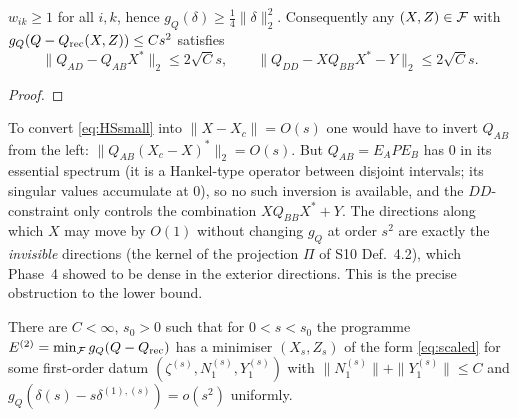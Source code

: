 \documentclass[11pt]{article}
\begin{document}
\begin{proposition}[Coercivity of $g_Q$]\label{prop:coerc}
$w_{ik}\ge1$ for all $i,k$, hence $g_Q(\delta)\ge\frac14\|\delta\|_2^2$.  Consequently any
$(X,Z)\in\mathcal F$ with $g_Q(Q-Q_{\rm rec}(X,Z))\le Cs^2$ satisfies
\begin{equation}\label{eq:HSsmall}
 \|Q_{AD}-Q_{AB}X^*\|_2\le2\sqrt Cs,\qquad \|Q_{DD}-XQ_{BB}X^*-Y\|_2\le2\sqrt Cs .
\end{equation}
\end{proposition}
\begin{proof}
\end{proof}

\begin{remark}\label{rem:noloc}
To convert \eqref{eq:HSsmall} into $\|X-X_c\|=O(s)$ one would have to invert $Q_{AB}$ from
the left: $\|Q_{AB}(X_c-X)^*\|_2=O(s)$.  But $Q_{AB}=E_APE_B$ has $0$ in its essential
spectrum (it is a Hankel-type operator between disjoint intervals; its singular values
accumulate at $0$), so no such inversion is available, and the $DD$-constraint only
controls the combination $XQ_{BB}X^*+Y$.  The directions along which $X$ may move by
$O(1)$ without changing $g_Q$ at order $s^2$ are exactly the \emph{invisible} directions
(the kernel of the projection $\Pi$ of S10 Def.~4.2), which Phase~4 showed to be dense in
the exterior directions.  This is the precise obstruction to the lower bound.
\end{remark}

\begin{definition}\label{hyp:H2}
There are $C<\infty$, $s_0>0$ such that for $0<s<s_0$ the programme $E^{(2)}=\min_\mathcal F g_Q(Q-Q_{\rm rec})$
has a minimiser $(X_s,Z_s)$ of the form \eqref{eq:scaled} for some first-order datum
$(\zeta^{(s)},N_1^{(s)},Y_1^{(s)})$ with $\|N_1^{(s)}\|+\|Y_1^{(s)}\|\le C$ and
$g_Q(\delta(s)-s\delta^{(1),(s)})=o(s^2)$ uniformly.
\end{definition}
\end{document}
